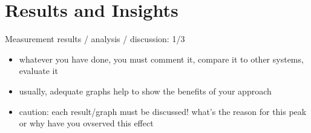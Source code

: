 
\chapter{Results and Insights}%
\label{sec:results}

Measurement results / analysis / discussion: 1/3

\begin{itemize}
    \item whatever you have done, you must comment it, compare it to other systems, evaluate it
    \item usually, adequate graphs help to show the benefits of your approach
    \item caution: each result/graph must be discussed! what's the reason for this peak or why have you ovserved this effect
\end{itemize}
